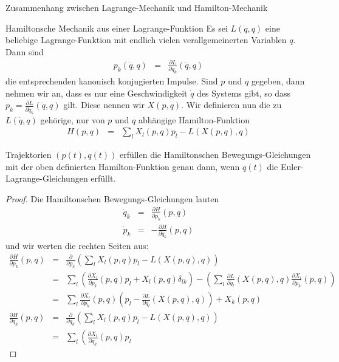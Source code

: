 \begin{chapter}{\titlestr}
\begin{appendix}
\begin{section}{Zusammenhang zwischen Lagrange-Mechanik und Hamilton-Mechanik}
\begin{subsection}{Hamiltonsche Mechanik aus einer Lagrange-Funktion}
\label{lagrange_to_hamiltion}
Es sei $L(\dot{q},q)$ eine beliebige Lagrange-Funktion mit endlich vielen verallgemeinerten Variablen $q$. Dann sind
\begin{eqnarray*}
p_k ( \dot{q}, q ) &=& \frac{\partial L}{\partial \dot{q}_k}(\dot{q}, q )
\end{eqnarray*}
die entsprechenden kanonisch konjugierten Impulse. Sind $p$ und $q$ gegeben, dann nehmen wir an, dass es nur eine
Geschwindigkeit $\dot{q}$ des Systems gibt, so dass $p_k = \frac{\partial L}{\partial \dot{q}_k}(\dot{q}, q )$ gilt.
Diese nennen wir $X(p,q)$. Wir definieren nun die zu $L(\dot{q},q)$ gehörige, nur von $p$ und $q$ abhängige Hamilton-Funktion
\begin{eqnarray}
\label{H_from_L}
H(p,q) &=& \sum_lX_l(p,q)p_l-L(X(p,q),q)
\end{eqnarray}
\begin{theorem}
Trajektorien $(p(t),q(t))$ erfüllen die Hamiltonschen Bewegungs-Gleichungen mit der oben definierten Hamilton-Funktion
genau dann, wenn $q(t)$ die Euler-Lagrange-Gleichungen erfüllt.
\end{theorem}
\begin{proof}
Die Hamiltonschen Bewegungs-Gleichungen lauten
\begin{eqnarray*}
\dot{q}_k &=& \frac{\partial H}{\partial p_k}(p,q)\\
\dot{p}_k &=&-\frac{\partial H}{\partial q_k}(p,q)
\end{eqnarray*}
und wir werten die rechten Seiten aus:
\begin{eqnarray*}
\frac{\partial H}{\partial p_k}(p,q) &=& \frac{\partial}{\partial p_k}\left(\sum_lX_l(p,q)p_l-L(X(p,q),q)\right)\\
&=& \sum_l\left(\frac{\partial X_l}{\partial p_k}(p,q)p_l+X_l(p,q)\delta_{lk}\right)
-\left(\sum_l\frac{\partial L}{\partial \dot{q}_l}(X(p,q),q)\frac{\partial X_l}{\partial p_k}(p,q)\right)\\
&=& \sum_l\frac{\partial X_l}{\partial p_k}(p,q)\left(p_l-\frac{\partial L}{\partial \dot{q}_l}(X(p,q),q)\right)+X_k(p,q)\\
\frac{\partial H}{\partial q_k}(p,q) &=& \frac{\partial}{\partial q_k}\left(\sum_lX_l(p,q)p_l-L(X(p,q),q)\right)\\
&=& \sum_l\left(\frac{\partial X_l}{\partial q_k}(p,q)p_l

\end{eqnarray*}
\end{proof}
\end{subsection}
\end{section}
\end{appendix}
\end{chapter}
